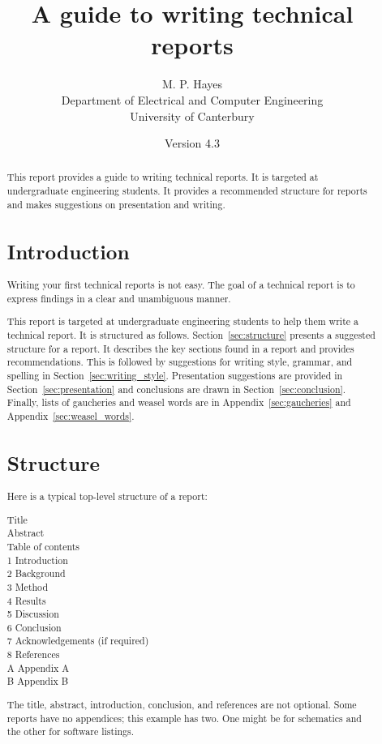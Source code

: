 \documentclass[a4paper,12pt]{article}
\title{\vspace{-1cm} A guide to writing technical reports}
\author{M. P. Hayes \\
        \small Department of Electrical and Computer Engineering\\
        \small University of Canterbury}
\date{\small Version 4.3}
\newcommand{\refsec}[1]{\mbox{Section~\ref{sec:#1}}}
\newcommand{\refapp}[1]{\mbox{Appendix~\ref{sec:#1}}}
\begin{document}
\maketitle

\begin{abstract}

This report provides a guide to writing technical reports.  It is
targeted at undergraduate engineering students.  It provides a
recommended structure for reports and makes suggestions on
presentation and writing.


\tableofcontents


\section{Introduction}

Writing your first technical reports is not easy.  The goal of a
technical report is to express findings in a clear and unambiguous
manner.

This report is targeted at undergraduate engineering students to help
them write a technical report.  It is structured as follows.
\refsec{structure} presents a suggested structure for a report.  It
describes the key sections found in a report and provides
recommendations.  This is followed by suggestions for writing style,
grammar, and spelling in \refsec{writing_style}.  Presentation
suggestions are provided in \refsec{presentation} and conclusions are
drawn in \refsec{conclusion}.  Finally, lists of gaucheries and weasel
words are in \refapp{gaucheries} and \refapp{weasel_words}.




\section{Structure}
\label{sec:structure}

Here is a typical top-level structure of a report:
\begin{flushleft}
  Title\\
  Abstract\\
  Table of contents\\
  1 Introduction\\
  2 Background\\
  3 Method\\
  4 Results\\
  5 Discussion\\
  6 Conclusion\\
  7 Acknowledgements (if required)\\
  8 References\\
  A Appendix A\\
  B Appendix B\\
\end{flushleft}
%
The title, abstract, introduction, conclusion, and references are not
optional.  Some reports have no appendices; this example has two.  One
might be for schematics and the other for software listings.



\end{abstract}
\end{document}
